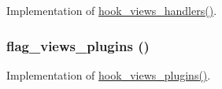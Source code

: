 Implementation of \hyperlink{group__views__hooks_gbf506f44bd8d8a86876f27396f5341ed}{hook\_\-views\_\-handlers()}. \hypertarget{flag_8views_8inc_20b8616140b3fe077b619b24b7c4eabd}{
\subsubsection[{flag\_\-views\_\-plugins}]{\setlength{\rightskip}{0pt plus 5cm}flag\_\-views\_\-plugins ()}}
\label{flag_8views_8inc_20b8616140b3fe077b619b24b7c4eabd}


Implementation of \hyperlink{group__views__hooks_g23f6e9972b2ed84fc54b7ff63f44477d}{hook\_\-views\_\-plugins()}. 